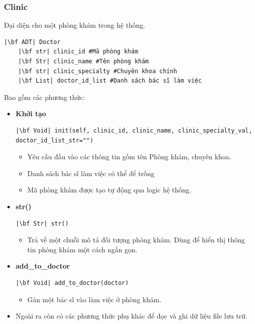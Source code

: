 \subsubsection{Clinic}
 Đại diện cho một phòng khám trong hệ thống.
\begin{verbatim}
|\bf ADT| Doctor
    |\bf str| clinic_id #Mã phòng khám
    |\bf Str| clinic_name #Tên phòng khám
    |\bf str| clinic_specialty #Chuyên khoa chính
    |\bf List| doctor_id_list #Danh sách bác sĩ làm việc
\end{verbatim}
Bao gồm các phương thức:
\begin{itemize}
    \item \textbf{Khởi tạo}
\begin{verbatim}
|\bf Void| init(self, clinic_id, clinic_name, clinic_specialty_val, doctor_id_list_str="")
\end{verbatim}
\begin{itemize}
    \item Yêu cầu đầu vào các thông tin gồm tên Phòng khám, chuyên khoa.
    \item Danh sách bác sĩ làm việc có thể để trống
    \item Mã phòng khám được tạo tự động qua logic hệ thống.
\end{itemize}
    \item \textbf{str()}
\begin{verbatim}
|\bf Str| str()
\end{verbatim}
\begin{itemize}
    \item Trả về một chuỗi mô tả đối tượng phòng khám. Dùng để hiển thị thông tin phòng khám một cách ngắn gọn.
\end{itemize}
\item \textbf{add\_to\_doctor}
\begin{verbatim}
|\bf Void| add_to_doctor(doctor)
\end{verbatim}
\begin{itemize}
    \item Gán một bác sĩ vào làm việc ở phòng khám.
\end{itemize}
\item Ngoài ra còn có các phương thức phụ khác để đọc và ghi dữ liệu file lưu trữ.
\end{itemize}